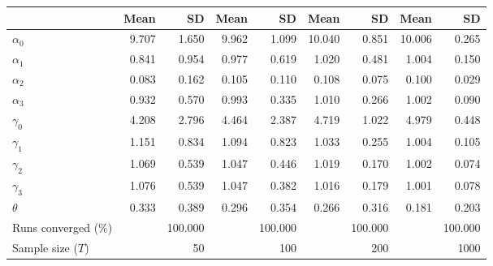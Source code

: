 
\begin{tabular}[t]{lrrrrrrrr}
\toprule
  & Mean & SD & Mean  & SD  & Mean   & SD   & Mean    & SD   \\
\midrule
$\alpha_{0}$ & 9.707 & 1.650 & 9.962 & 1.099 & 10.040 & 0.851 & 10.006 & 0.265\\
$\alpha_{1}$ & 0.841 & 0.954 & 0.977 & 0.619 & 1.020 & 0.481 & 1.004 & 0.150\\
$\alpha_{2}$ & 0.083 & 0.162 & 0.105 & 0.110 & 0.108 & 0.075 & 0.100 & 0.029\\
$\alpha_{3}$ & 0.932 & 0.570 & 0.993 & 0.335 & 1.010 & 0.266 & 1.002 & 0.090\\
$\gamma_{0}$ & 4.208 & 2.796 & 4.464 & 2.387 & 4.719 & 1.022 & 4.979 & 0.448\\
$\gamma_{1}$ & 1.151 & 0.834 & 1.094 & 0.823 & 1.033 & 0.255 & 1.004 & 0.105\\
$\gamma_{2}$ & 1.069 & 0.539 & 1.047 & 0.446 & 1.019 & 0.170 & 1.002 & 0.074\\
$\gamma_{3}$ & 1.076 & 0.539 & 1.047 & 0.382 & 1.016 & 0.179 & 1.001 & 0.078\\
$\theta$ & 0.333 & 0.389 & 0.296 & 0.354 & 0.266 & 0.316 & 0.181 & 0.203\\
Runs converged (\%) &  & 100.000 &  & 100.000 &  & 100.000 &  & 100.000\\
Sample size ($T$) &  & 50 &  & 100 &  & 200 &  & 1000\\
\bottomrule
\end{tabular}
